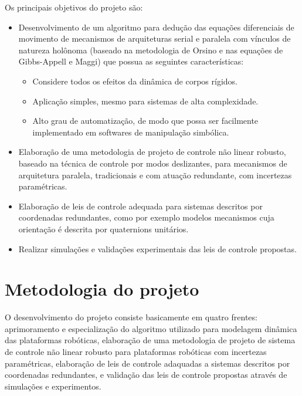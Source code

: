 \documentclass[a4paper,11pt,brazil,fleqn]{article}
\begin{document}
Os principais objetivos do projeto s\~ao:
\begin{itemize}
\item Desenvolvimento de um algoritmo para dedu\c{c}\~ao das equa\c{c}\~oes diferenciais de movimento de mecanismos de arquiteturas serial e paralela com v\'inculos de natureza hol\^onoma (baseado na metodologia de Orsino e nas equa\c{c}\~oes de Gibbs-Appell e Maggi) que possua as seguintes caracter\'isticas:
\begin{itemize}
\item Considere todos os efeitos da din\^amica de corpos r\'igidos.
\item Aplica\c{c}\~ao simples, mesmo para sistemas de alta complexidade.
\item Alto grau de automatiza\c{c}\~ao, de modo que possa ser facilmente implementado em softwares de manipula\c{c}\~ao simb\'olica.
\end{itemize}
\item Elabora\c{c}\~ao de uma metodologia de projeto de controle n\~ao linear robusto, baseado na t\'ecnica de controle por modos deslizantes, para mecanismos de arquitetura paralela, tradicionais e com atua\c{c}\~ao redundante, com incertezas param\'etricas.
\item Elabora\c{c}\~ao de leis de controle adequada para sistemas descritos por coordenadas redundantes, como por exemplo modelos mecanismos cuja orienta\c{c}\~ao \'e descrita por quaternions unit\'arios.
\item Realizar simula\c{c}\~oes e valida\c{c}\~oes experimentais das leis de controle propostas.
\end{itemize}

 

\section{Metodologia do projeto}\label{S03}

O desenvolvimento do projeto consiste basicamente em quatro frentes: aprimoramento e especializa\c{c}\~ao do algoritmo utilizado para modelagem din\^amica das plataformas rob\'oticas, elabora\c{c}\~ao de uma metodologia de projeto de sistema de controle n\~ao linear robusto para plataformas rob\'oticas com incertezas param\'etricas, elabora\c{c}\~ao de leis de controle adaquadas a sistemas descritos por coordenadas redundantes, e valida\c{c}\~ao das leis de controle propostas atrav\'es de simula\c{c}\~oes e experimentos. 
\end{document}
